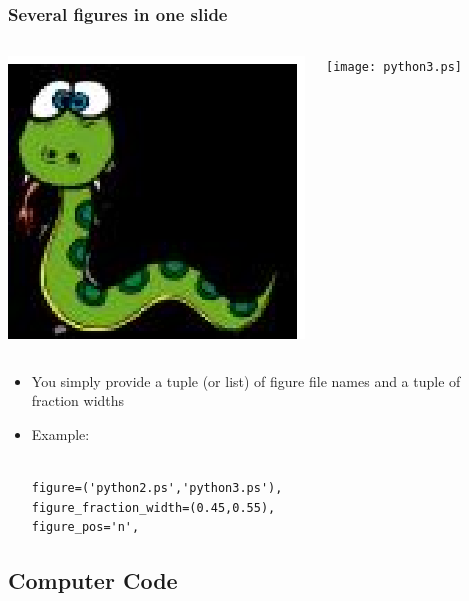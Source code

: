 \documentclass{beamer}
\begin{document}
\begin{frame}[fragile]
\frametitle{Several figures in one slide}


\begin{columns}

\centerline{\includegraphics[width=0.450000\linewidth,keepaspectratio]{python2.ps}}

\centerline{\texttt{[image: python3.ps]}}

\end{columns}
\begin{itemize}
\item You simply provide a tuple (or list) of figure file names and a tuple of fraction widths
\item Example:\begin{Verbatim}[fontsize=\footnotesize,tabsize=4,baselinestretch=0.85,fontfamily=tt,xleftmargin=7mm]

figure=('python2.ps','python3.ps'),
figure_fraction_width=(0.45,0.55),
figure_pos='n',
\end{Verbatim}

\end{itemize}

\end{frame}

\subsection[Code]{Computer Code}
\end{document}
